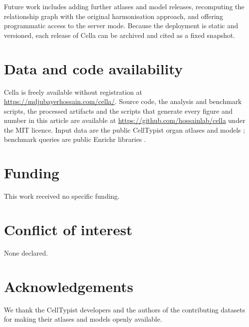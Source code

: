 \documentclass[11pt]{article}
\newcommand{\cella}{Cella}
\begin{document}
Future work includes adding further atlases and model releases, recomputing the relationship graph with the original harmonisation approach, and offering programmatic access to the server mode. Because the deployment is static and versioned, each release of \cella{} can be archived and cited as a fixed snapshot.

\section*{Data and code availability}

\cella{} is freely available without registration at \url{https://mdjubayerhossain.com/cella/}. Source code, the analysis and benchmark scripts, the processed artifacts and the scripts that generate every figure and number in this article are available at \url{https://github.com/hossainlab/cella} under the MIT licence. Input data are the public CellTypist organ atlases and models \cite{celltypistorgans}; benchmark queries are public Enrichr libraries \cite{kuleshov2016}. %

\section*{Funding}

This work received no specific funding.

\section*{Conflict of interest}

None declared.

\section*{Acknowledgements}

We thank the CellTypist developers and the authors of the contributing datasets for making their atlases and models openly available.



\end{document}
